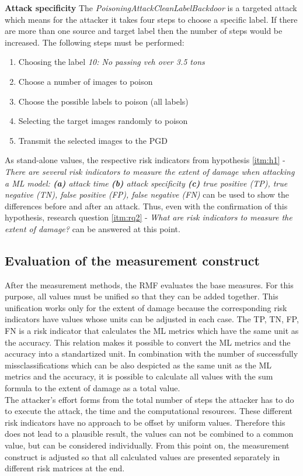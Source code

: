 \noindent\textbf{Attack specificity} The \textit{PoisoningAttackCleanLabelBackdoor} is a targeted attack which means for the attacker it takes four steps to choose a specific label. If there are more than one source and target label then the number of steps would be increased. The following steps must be performed:

\begin{enumerate}
  \item Choosing the label \textit{10: No passing veh over 3.5 tons}
  \item Choose a number of images to poison
  \item Choose the possible labels to poison (all labels)
  \item Selecting the target images randomly to poison
  \item Transmit the selected images to the PGD
\end{enumerate}

As stand-alone values, the respective risk indicators from hypothesis \ref{itm:h1} - \textit{There are several risk indicators to measure the extent of damage when attacking a ML model: \textbf{(a)} attack time \textbf{(b)} attack specificity \textbf{(c)} true positive (TP), true negative (TN), false positive (FP), false negative (FN)} can be used to show the differences before and after an attack. Thus, even with the confirmation of this hypothesis, research question \ref{itm:rq2} - \textit{What are risk indicators to measure the extent of damage?} can be answered at this point.
\subsection{Evaluation of the measurement construct}

After the measurement methods, the RMF evaluates the base measures. For this purpose, all values must be unified so that they can be added together. This unification works only for the extent of damage because the corresponding risk indicators have values whose units can be adjusted in each case. The TP, TN, FP, FN is a risk indicator that calculates the ML metrics which have the same unit as the accuracy. This relation makes it possible to convert the ML metrics and the accuracy into a standartized unit. In combination with the number of successfully missclassifications which can be also despicted as the same unit as the ML metrics and the accuracy, it is possible to calculate all values with the sum formula to the extent of damage as a total value. \\
The attacker's effort forms from the total number of steps the attacker has to do to execute the attack, the time and the computational resources. These different risk indicators have no approach to be offset by uniform values. Therefore this does not lead to a plausible result, the values can not be combined to a common value, but can be considered individually. From this point on, the measurement construct is adjusted so that all calculated values are presented separately in different risk matrices at the end.

